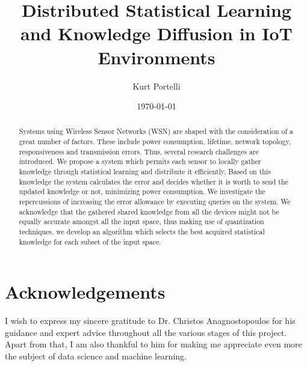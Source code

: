\documentclass{mproj}
\begin{document}
\title{Distributed Statistical Learning and Knowledge Diffusion in IoT
Environments}
\author{Kurt Portelli}
\date{\today}
\maketitle



\begin{abstract}
Systems using Wireless Sensor Networks (WSN) are shaped with the consideration of a great number of factors. These include power consumption, lifetime, network topology, responsiveness and transmission errors. Thus, several research challenges are introduced. We propose a system which permits each sensor to locally gather knowledge through statistical learning and distribute it efficiently. Based on this knowledge the system calculates the error and decides whether it is worth to send the updated knowledge or not, minimizing power consumption. We investigate the repercussions of increasing the error allowance by executing queries on the system. We acknowledge that the gathered shared knowledge from all the devices might not be equally accurate amongst all the input space, thus making use of quantization techniques, we develop an algorithm which selects the best acquired statistical knowledge for each subset of the input space.
\end{abstract}

\educationalconsent


\newpage
\section*{Acknowledgements}
I wish to express my sincere gratitude to Dr. Christos Anagnostopoulos for his guidance and expert advice throughout all the various stages of this project. Apart from that, I am also thankful to him for making me appreciate even more the subject of data science and machine learning.
\end{document}
